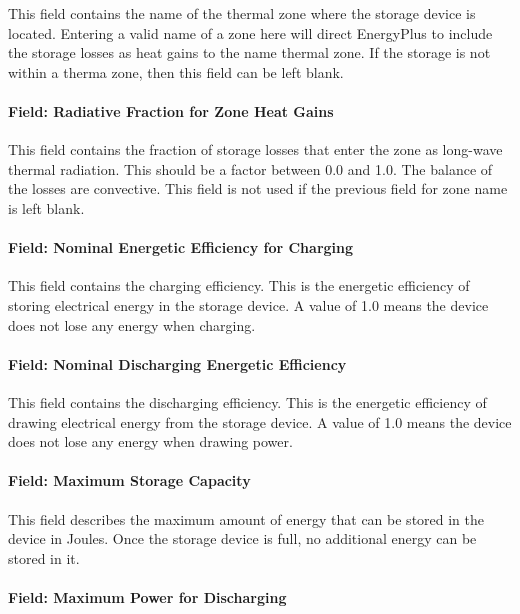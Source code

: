 This field contains the name of the thermal zone where the storage device is located. Entering a valid name of a zone here will direct EnergyPlus to include the storage losses as heat gains to the name thermal zone. If the storage is not within a therma zone, then this field can be left blank.

\paragraph{Field: Radiative Fraction for Zone Heat Gains}\label{field-radiative-fraction-for-zone-heat-gains}

This field contains the fraction of storage losses that enter the zone as long-wave thermal radiation. This should be a factor between 0.0 and 1.0. The balance of the losses are convective. This field is not used if the previous field for zone name is left blank.

\paragraph{Field: Nominal Energetic Efficiency for Charging}\label{field-nominal-energetic-efficiency-for-charging}

This field contains the charging efficiency. This is the energetic efficiency of storing electrical energy in the storage device. A value of 1.0 means the device does not lose any energy when charging.

\paragraph{Field: Nominal Discharging Energetic Efficiency}\label{field-nominal-discharging-energetic-efficiency}

This field contains the discharging efficiency. This is the energetic efficiency of drawing electrical energy from the storage device. A value of 1.0 means the device does not lose any energy when drawing power.

\paragraph{Field: Maximum Storage Capacity}\label{field-maximum-storage-capacity}

This field describes the maximum amount of energy that can be stored in the device in Joules. Once the storage device is full, no additional energy can be stored in it.

\paragraph{Field: Maximum Power for Discharging}\label{field-maximum-power-for-discharging}

